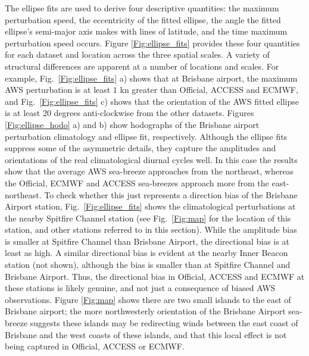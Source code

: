 \documentclass[twocol]{ametsoc}
\begin{document}
The ellipse fits are used to derive four descriptive quantities: the maximum perturbation speed, the eccentricity of the fitted ellipse, the angle the fitted ellipse's semi-major axis makes with lines of latitude, and the time maximum perturbation speed occurs. Figure \ref{Fig:ellipse_fits} provides these four quantities for each dataset and location across the three spatial scales. A variety of structural differences are apparent at a number of locations and scales. For example, Fig.~\ref{Fig:ellipse_fits} a) shows that at Brisbane airport, the maximum AWS perturbation is at least $1$ kn greater than Official, ACCESS and ECMWF, and Fig.~\ref{Fig:ellipse_fits} c) shows that the orientation of the AWS fitted ellipse is at least 20 degrees anti-clockwise from the other datasets. Figures \ref{Fig:ellipse_hodo} a) and b) show hodographs of the Brisbane airport perturbation climatology and ellipse fit, respectively. Although the ellipse fits suppress some of the asymmetric details, they capture the amplitudes and orientations of the real climatological diurnal cycles well. In this case the results show that the average AWS sea-breeze approaches from the northeast, whereas the Official, ECMWF and ACCESS sea-breezes approach more from the east-northeast. To check whether this just represents a direction bias of the Brisbane Airport station, Fig.~\ref{Fig:ellipse_fits} shows the climatological perturbations at the nearby Spitfire Channel station (see Fig.~\ref{Fig:map} for the location of this station, and other stations referred to in this section). While the amplitude bias is smaller at Spitfire Channel than Brisbane Airport, the directional bias is at least as high. A similar directional bias is evident at the nearby Inner Beacon station (not shown), although the bias is smaller than at Spitfire Channel and Brisbane Airport. Thus, the directional bias in Official, ACCESS and ECMWF at these stations is likely genuine, and not just a consequence of biased AWS observations. Figure \ref{Fig:map} shows there are two small islands to the east of Brisbane airport; the more northwesterly orientation of the Brisbane Airport sea-breeze suggests these islands may be redirecting winds between the east coast of Brisbane and the west coasts of these islands, and that this local effect is not being captured in Official, ACCESS or ECMWF.            
\end{document}
